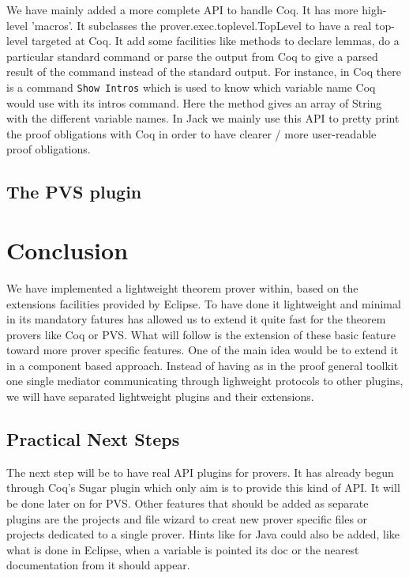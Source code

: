 \documentclass{entcs}
\begin{document}
We have mainly added a more complete API to handle Coq. It has more high-level
'macros'. It subclasses the prover.exec.toplevel.TopLevel to have a real top-level
targeted at Coq. It add some facilities like methods to declare lemmas, do a particular
standard command or parse the output from Coq to give a parsed result of the command
instead of the standard output. For instance, in Coq there is a command {\tt Show Intros} which
is used to know which variable name Coq would use with its  intros command. Here the
method gives an array of String with the different variable names.
In Jack we mainly use this API to pretty print the proof obligations with Coq in order
to have clearer / more user-readable proof obligations.

\subsection{The PVS plugin}
\section{Conclusion}

We have implemented a lightweight theorem prover within, based on the extensions
facilities provided by Eclipse. To have done it lightweight and minimal in its mandatory
fatures has allowed us to extend it quite fast for the theorem provers like Coq or PVS.
What will follow is the extension of these basic feature toward more prover specific features.
One of the main idea would be to extend it in a component based approach.
Instead of having as in the proof general toolkit one single mediator communicating
through lighweight protocols to other plugins, we will have separated lightweight
plugins and their extensions.

\subsection{Practical Next Steps}
The next step will be to have real API plugins for provers. It has already begun
through Coq's Sugar plugin which only aim is to provide this kind of API.
It will be done later on for PVS. Other features that should be added
as separate plugins are the projects and file wizard to creat new prover specific
files or projects dedicated to a single prover.
Hints like for Java could also be added, like what is done in Eclipse, when a variable
is pointed its doc or the nearest documentation from it should appear. 
\end{document}
